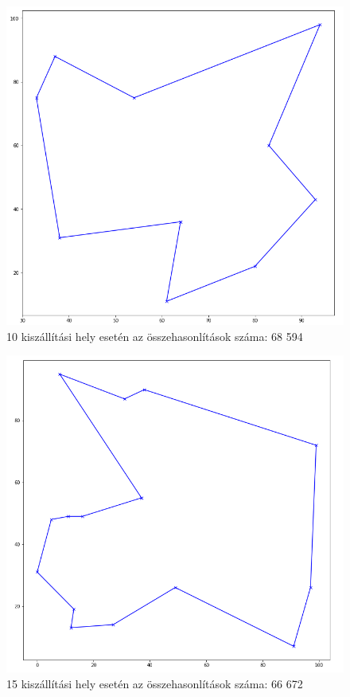 \begin{figure}[h!]
\centering
\includegraphics[scale=0.4]{images/10.png}
\caption{10 kiszállítási hely esetén az összehasonlítások száma: 68 594}
\label{fig:tsp10location}
\end{figure}

\begin{figure}[h!]
\centering
\includegraphics[scale=0.4]{images/15.png}
\caption{15 kiszállítási hely esetén az összehasonlítások száma: 66 672}
\label{fig:tsp15location}
\end{figure}

